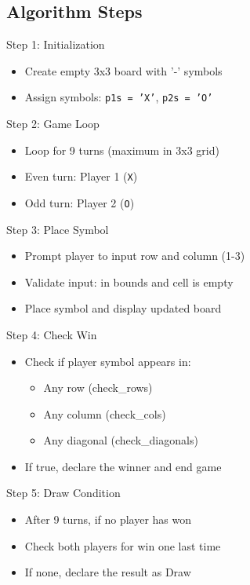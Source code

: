 \documentclass{beamer}
\begin{document}
\subsection{Algorithm Steps}
\begin{frame}{Step 1: Initialization}
\begin{itemize}
  \item Create empty 3x3 board with '-' symbols
  \item Assign symbols: \texttt{p1s = 'X'}, \texttt{p2s = 'O'}
\end{itemize}
\end{frame}

\begin{frame}{Step 2: Game Loop}
\begin{itemize}
  \item Loop for 9 turns (maximum in 3x3 grid)
  \item Even turn: Player 1 (\texttt{X})
  \item Odd turn: Player 2 (\texttt{O})
\end{itemize}
\end{frame}

\begin{frame}{Step 3: Place Symbol}
\begin{itemize}
  \item Prompt player to input row and column (1-3)
  \item Validate input: in bounds and cell is empty
  \item Place symbol and display updated board
\end{itemize}
\end{frame}

\begin{frame}{Step 4: Check Win}
\begin{itemize}
  \item Check if player symbol appears in:
  \begin{itemize}
    \item Any row (check\_rows)
    \item Any column (check\_cols)
    \item Any diagonal (check\_diagonals)
  \end{itemize}
  \item If true, declare the winner and end game
\end{itemize}
\end{frame}

\begin{frame}{Step 5: Draw Condition}
\begin{itemize}
  \item After 9 turns, if no player has won
  \item Check both players for win one last time
  \item If none, declare the result as Draw
\end{itemize}
\end{frame}
\end{document}
